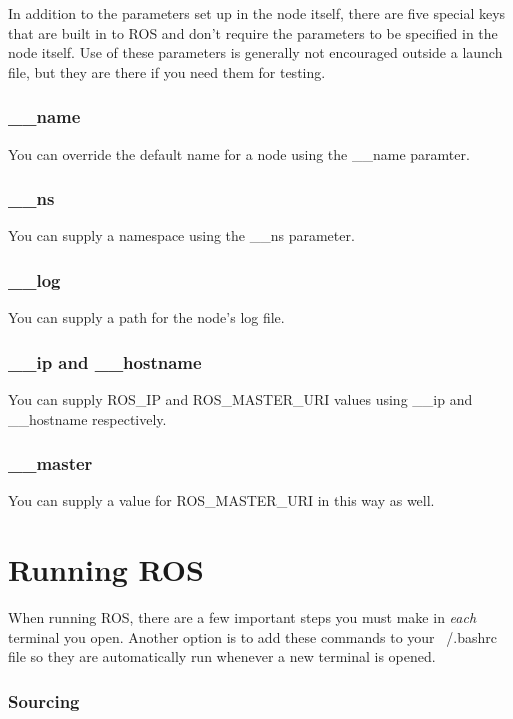 In addition to the parameters set up in the node itself, there are five special keys that are built in to ROS and don't require the parameters to be specified in the node itself. Use of these parameters is generally not encouraged outside a launch file, but they are there if you need them for testing.
 
\subsubsection{\_\_name}

You can override the default name for a node using the \_\_name paramter.

\subsubsection{\_\_ns}

You can supply a namespace using the \_\_ns parameter.

\subsubsection{\_\_log}

You can supply a path for the node's log file.

\subsubsection{\_\_ip and \_\_hostname}

You can supply ROS\_IP and ROS\_MASTER\_URI values using \_\_ip and \_\_hostname respectively.

\subsubsection{\_\_master}

You can supply a value for ROS\_MASTER\_URI in this way as well.
 
\section{Running ROS}

When running ROS, there are a few important steps you must make in \textit{each} terminal you open. Another option is to add these commands to your ~/.bashrc file so they are automatically run whenever a new terminal is opened.

\subsubsection{Sourcing}

